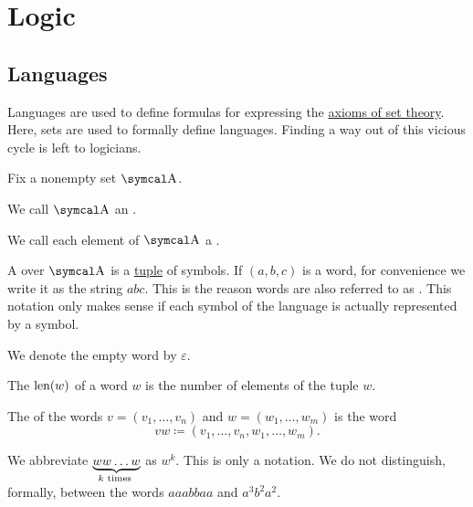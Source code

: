 \section{Logic}\label{sec:logic}
\subsection{Languages}\label{subsec:languages}

\begin{remark}\label{rem:language_definitions_using_sets}
  Languages are used to define formulas for expressing the \hyperref[def:set_zfc]{axioms of set theory}. Here, sets are used to formally define languages. Finding a way out of this vicious cycle is left to logicians.
\end{remark}

\begin{definition}\label{def:language}
  Fix a nonempty set \( \CA \).

  \begin{DefEnum}
     We call \( \CA \) an .

     We call each element of \( \CA \) a .

     A  over \( \CA \) is a \hyperref[def:cartesian_product]{tuple} of symbols. If \( (a, b, c) \) is a word, for convenience we write it as the string \( abc \). This is the reason words are also referred to as . This notation only makes sense if each symbol of the language is actually represented by a symbol.

     We denote the empty word by \( \varepsilon \).

     The  \( \operatorname{len}(w) \) of a word \( w \) is the number of elements of the tuple \( w \).

     The  of the words \( v = (v_1, \ldots, v_n) \) and \( w = (w_1, \ldots, w_m) \) is the word
    \begin{equation*}
      vw \coloneqq (v_1, \ldots, v_n, w_1, \ldots, w_m).
    \end{equation*}

    We abbreviate \( \underbrace{w w \ldots w}_{k \text{ times }} \) as \( w^k \). This is only a notation. We do not distinguish, formally, between the words \( aaabbaa \) and \( a^3 b^2 a^2 \).


\end{DefEnum}
\end{definition}
